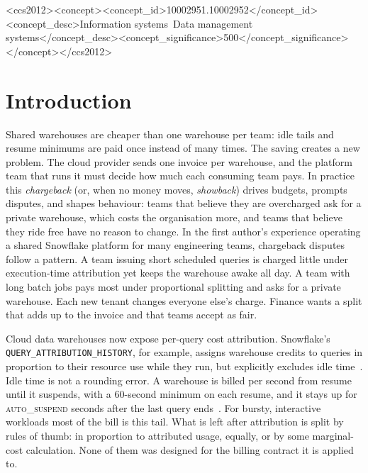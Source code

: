 \documentclass[sigconf]{acmart}
\newcommand{\autos}{\textsc{auto\_suspend}}
\begin{document}
\begin{CCSXML}
<ccs2012><concept><concept_id>10002951.10002952</concept_id><concept_desc>Information systems~Data management systems</concept_desc><concept_significance>500</concept_significance></concept></ccs2012>
\end{CCSXML}

\maketitle

\section{Introduction}
Shared warehouses are cheaper than one warehouse per team: idle tails and resume minimums are paid once instead of many
times. The saving creates a new problem. The cloud provider sends one invoice per warehouse, and the platform team that runs
it must decide how much each consuming team pays. In practice this \emph{chargeback} (or, when no money moves,
\emph{showback}) drives budgets, prompts disputes, and shapes behaviour: teams that believe they are overcharged ask for a
private warehouse, which costs the organisation more, and teams that believe they ride free have no reason to change.
In the first author's experience operating a shared Snowflake platform for many engineering teams, chargeback disputes follow
a pattern. A team issuing short scheduled queries is charged little under execution-time attribution yet keeps the
warehouse awake all day. A team with long batch jobs pays most under proportional splitting and asks for a private
warehouse. Each new tenant changes everyone else's charge. Finance wants a split that adds up to the invoice and that
teams accept as fair.

Cloud data warehouses now expose per-query cost attribution. Snowflake's
\texttt{QUERY\_\allowbreak ATTRIBUTION\_\allowbreak HISTORY}, for example, assigns warehouse credits to queries in
proportion to their resource use while they run, but explicitly excludes idle time~\cite{sf-attribution}. Idle time is not a
rounding error. A warehouse is billed per second from resume until it suspends, with a 60-second minimum on each resume, and it stays
up for \autos{} seconds after the last query ends~\cite{sf-warehouses,sf-create}. For bursty, interactive workloads most of
the bill is this tail. What is left after attribution is split by rules of thumb: in proportion to attributed usage,
equally, or by some marginal-cost calculation. None of them was designed for the billing contract it is applied to.
\end{document}
